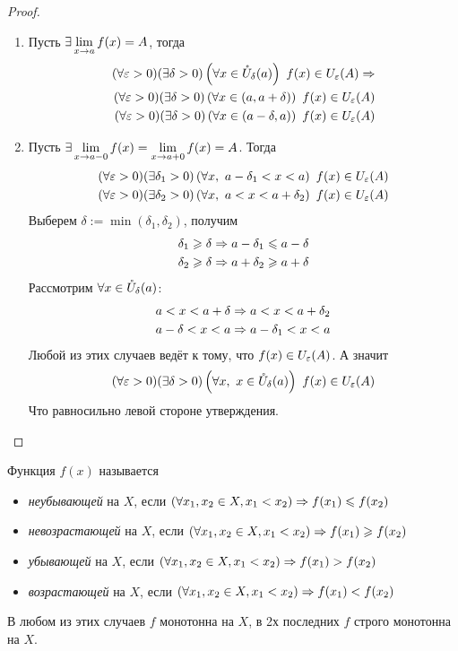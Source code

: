 \begin{proof}
\begin{enumerate}
	\item Пусть $\exists \lim\limits_{x \to a} f(x) = A$, тогда
	\begin{align*}
		(\forall \eps > 0)(\exists \delta > 0)
		\left(\forall x \in \mc{U}_{\delta} (a)\right)\ 
		f(x) \in U_{\eps}(A) \Ra
		\\
		(\forall \eps > 0)(\exists \delta > 0)
		\left(\forall x \in (a, a + \delta)\right)\ 
		f(x) \in U_{\eps}(A)
		\\
		(\forall \eps > 0)(\exists \delta > 0)
		\left(\forall x \in (a - \delta, a)\right)\ 
		f(x) \in U_{\eps}(A)
	\end{align*}
	
	
	\item Пусть $\exists \lim\limits_{x \to a-0} f(x) = \lim\limits_{x \to a+0} f(x) = A$. Тогда
	\begin{align*}
		(\forall \eps > 0)(\exists \delta_1 > 0)
		\left( \forall x,\ a - \delta_1 < x < a\right)\ 
		f(x) \in U_{\eps}(A)
		\\
		(\forall \eps > 0)(\exists \delta_2 > 0)
		\left(\forall x,\ a < x < a + \delta_2\right)\ 
		f(x) \in U_{\eps}(A)
	\end{align*}
	Выберем $\delta := \min(\delta_1, \delta_2)$, получим
	\begin{align*}
		\delta_1 \geqslant \delta \Rightarrow a - \delta_1 \leqslant a - \delta
		\\
		\delta_2 \geqslant \delta \Rightarrow a + \delta_2 \geqslant a + \delta
	\end{align*}
	Рассмотрим $\forall x \in \mathring{U}_\delta(a)$:
	\begin{align*}
		a < x < a + \delta \Rightarrow a < x < a + \delta_2
		\\
		a - \delta < x < a \Rightarrow a - \delta_1 < x < a
	\end{align*}
	Любой из этих случаев ведёт к тому, что $f(x) \in U_{\varepsilon}(A)$. А значит
	\[
		(\forall \varepsilon > 0)(\exists \delta > 0)
		\left(\forall x,\ x \in \mathring{U}_{\delta}(a)\right)
		\ f(x) \in U_{\varepsilon}(A)
	\]
	Что равносильно левой стороне утверждения.
\end{enumerate}

\end{proof}

\begin{definition}
	Функция $f(x)$ называется
	\begin{itemize}
		\item \textit{неубывающей} на $X$, если 
			$(\forall x_1, x_2 \in X, x_1 < x_2)
			\Rightarrow f(x_1) \leqslant f(x_2)$
		\item \textit{невозрастающей} на $X$, если 
			$(\forall x_1, x_2 \in X, x_1 < x_2)
			\Rightarrow f(x_1) \geqslant f(x_2)$
		\item \textit{убывающей} на $X$, если 
			$(\forall x_1, x_2 \in X, x_1 < x_2)
			\Rightarrow f(x_1) > f(x_2)$
		\item \textit{возрастающей} на $X$, если 
			$(\forall x_1, x_2 \in X, x_1 < x_2)
			\Rightarrow f(x_1) < f(x_2)$
	\end{itemize}
	В любом из этих случаев $f$ монотонна на $X$, в 2х последних $f$ строго монотонна на $X$.
\end{definition}

